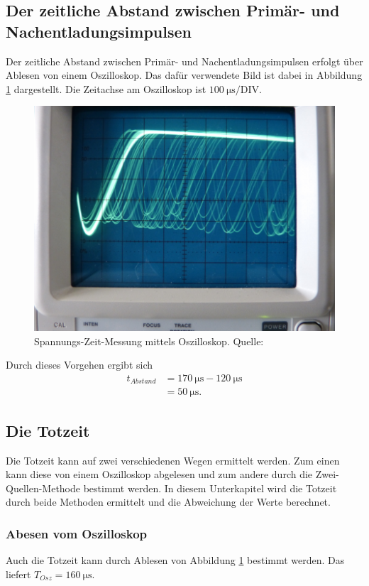 \subsection{Der zeitliche Abstand zwischen Primär- und Nachentladungsimpulsen}
\label{subsec:abstand}
Der zeitliche Abstand zwischen Primär- und Nachentladungsimpulsen erfolgt über Ablesen von einem
Oszilloskop. Das dafür verwendete Bild ist dabei in Abbildung \ref{fig:Osz} dargestellt. Die Zeitachse
am Oszilloskop ist $\SI{100}{\micro\second}/\text{DIV}$.
\begin{figure}[H]
    \centering
    \includegraphics[scale=0.5]{content/Osz.png}
    \caption{Spannungs-Zeit-Messung mittels Oszilloskop. Quelle:\cite{AP02}}
    \label{fig:Osz}
  \end{figure}
Durch dieses Vorgehen ergibt sich
\begin{align*}
    t_{Abstand}&=\SI{170}{\micro\second}-\SI{120}{\micro\second}\\
               &=\SI{50}{\micro\second}.
\end{align*}

\subsection{Die Totzeit}
\label{subsec:totzeit}
Die Totzeit kann auf zwei verschiedenen Wegen ermittelt werden. Zum einen kann diese von einem Oszilloskop
abgelesen und zum andere durch die Zwei-Quellen-Methode bestimmt werden. 
In diesem Unterkapitel wird die Totzeit durch beide Methoden ermittelt und die Abweichung der Werte 
berechnet. 
\subsubsection*{Abesen vom Oszilloskop}
        Auch die Totzeit kann durch Ablesen von Abbildung \ref{fig:Osz} bestimmt werden. Das liefert
        $T_{Osz}=\SI{160}{\micro\second}$.
